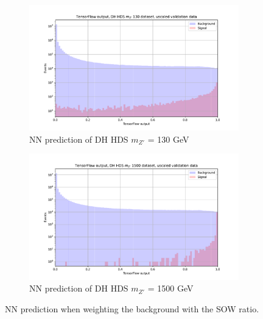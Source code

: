\documentclass[14pt, a4paper]{book}
\begin{document}
\begin{figure}[!ht]
	\centering
	\begin{subfigure}[b]{0.49\textwidth}
        \centering
        \includegraphics[width=1\textwidth]{DH_HDS_mZp_130/VAL_unscaled.pdf}
        \caption{NN prediction of DH HDS $m_{Z'}$ = 130 GeV}\label{fig:MC_WGT_BKG_DH_HDS_130}
     \end{subfigure}
     \hfill
     \begin{subfigure}[b]{0.49\textwidth}
        \centering
        \includegraphics[width=1\textwidth]{DH_HDS_mZp_1500/VAL_unscaled.pdf}
        \caption{NN prediction of DH HDS $m_{Z'}$ = 1500 GeV}\label{fig:MC_WGT_BKG_DH_HDS_1500}
     \end{subfigure}
     \caption{NN prediction when weighting the background with the SOW ratio.}\label{fig:MC_WGT_BKG_DH_HDS}
\end{figure}
\graphicspath{{../../../Plots/TESTING/NeuralNetwork/BALANCED_WEIGHTING/MC_EVENTS_BKG_DOWN/}}
\end{document}
